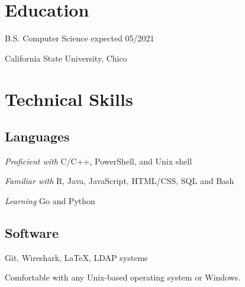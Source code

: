 \documentclass[letterpaper]{article}
\renewenvironment{itemize}{
  \begin{list}{}{
    \setlength{\leftmargin}{1.5em}
  }
}{
  \end{list}
}
\begin{document}
\hspace{0.5cm}
\begin{minipage}[t]{0.475\linewidth}
    \section*{Education}
    \begin{itemize}
    \item B.S. Computer Science expected 05/2021

        California State University, Chico
    \end{itemize}
    \section*{Technical Skills}

    \subsection*{Languages}
    \begin{itemize}
        \item \emph{Proficient with} C/C++, PowerShell, and Unix shell
        \item \emph{Familiar with} R, Java, JavaScript, HTML/CSS, SQL and Bash 
        \item \emph{Learning} Go and Python
    \end{itemize}
    \subsection*{Software}
    \begin{itemize}
    \item Git, Wireshark, \LaTeX, LDAP systems
    \item Comfortable with any Unix-based operating system or Windows.
    \end{itemize}
\end{minipage}
\end{document}
